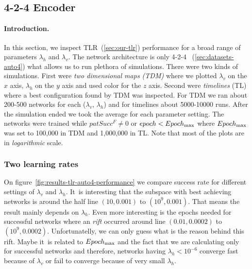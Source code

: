 

\subsection{4-2-4 Encoder} 
\label{sec:results-auto4} 

\paragraph{Introduction.} 
\label{sec:results-auto4-introduction} 
In this section, we inspect TLR~(\ref{sec:our-tlr}) performance for a broad range of parameters $\lambda_h$ and $\lambda_v$. The network architecture is only 4-2-4~
(\ref{sec:datasets-auto4}) what allows us to run plethora of simulations. There were two kinds of simulations. First were \emph{two dimensional maps (TDM)} where we plotted $\lambda_v$ on the $x$ axis, $\lambda_h$ on the $y$ axis and used color for the $z$ axis. Second were \emph{timelines} (TL) where a best configuration found by TDM was inspected. For TDM we ran about 200-500 networks for each ($\lambda_v$, $\lambda_h$) and for timelines about 5000-10000 runs. After the simulation ended we took the average for each parameter setting. The networks were trained while $patSucc^F \neq 0$ or $epoch < Epoch_{\rm max}$ where $Epoch_{\rm max}$ was set to 100,000 in TDM and 1,000,000 in TL. Note that most of the plots are in \emph{logarithmic} scale. 

 

\subsubsection{Two learning rates} 
\label{sec:tlr-auto4}

On figure~\ref{fig:results-tlr-auto4-performance} we compare success rate for different settings of $\lambda_v$ and $\lambda_h$. It~is interesting that the subspace with best achieving networks is around the half line $(10, 0.001)$ to $(10^9, 0.001)$. That means the result mainly depends on $\lambda_h$. Even more interesting is the epochs needed for successful networks where an \emph{rift} occurred around line $(0.01, 0.0002)$ to $(10^9, 0.0002)$. Unfortunatelly, we can only guess what is the reason behind this rift. Maybe it~is related to $Epoch_{\rm max}$ and the fact that we are calculating only for successful networks and therefore, networks having $\lambda_h < 10^{-6}$ converge fast because of $\lambda_v$ or fail to converge because of very small $\lambda_h$. 

